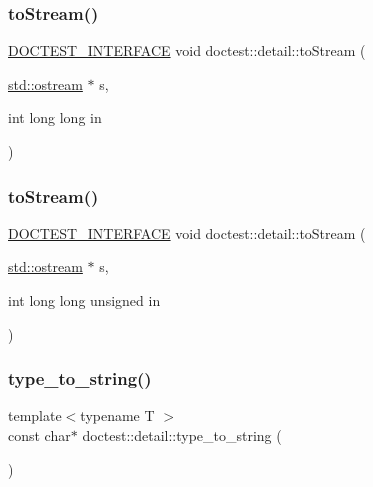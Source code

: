 \subsubsection{\texorpdfstring{to\+Stream()}{toStream()}\hspace{0.1cm}{\footnotesize\ttfamily [15/16]}}
{\footnotesize\ttfamily \hyperlink{doctest_8h_a9c16ffc635ec47f07797d21ede26b1a5}{D\+O\+C\+T\+E\+S\+T\+\_\+\+I\+N\+T\+E\+R\+F\+A\+CE} void doctest\+::detail\+::to\+Stream (\begin{DoxyParamCaption}\item[{\hyperlink{doctest_8h_a116af65cb5e924b33ad9d9ecd7a783f3}{std\+::ostream} $\ast$}]{s,  }\item[{int long long}]{in }\end{DoxyParamCaption})}

\mbox{\label{namespacedoctest_1_1detail_a22df719818a3df2b975ba0f7045cc8fd}} 
\subsubsection{\texorpdfstring{to\+Stream()}{toStream()}\hspace{0.1cm}{\footnotesize\ttfamily [16/16]}}
{\footnotesize\ttfamily \hyperlink{doctest_8h_a9c16ffc635ec47f07797d21ede26b1a5}{D\+O\+C\+T\+E\+S\+T\+\_\+\+I\+N\+T\+E\+R\+F\+A\+CE} void doctest\+::detail\+::to\+Stream (\begin{DoxyParamCaption}\item[{\hyperlink{doctest_8h_a116af65cb5e924b33ad9d9ecd7a783f3}{std\+::ostream} $\ast$}]{s,  }\item[{int long long unsigned}]{in }\end{DoxyParamCaption})}

\mbox{\label{namespacedoctest_1_1detail_a8ad4f98867561d1ca7865874a2f82d7e}} 
\subsubsection{\texorpdfstring{type\+\_\+to\+\_\+string()}{type\_to\_string()}}
{\footnotesize\ttfamily template$<$typename T $>$ \\
const char$\ast$ doctest\+::detail\+::type\+\_\+to\+\_\+string (\begin{DoxyParamCaption}{ }\end{DoxyParamCaption})}

